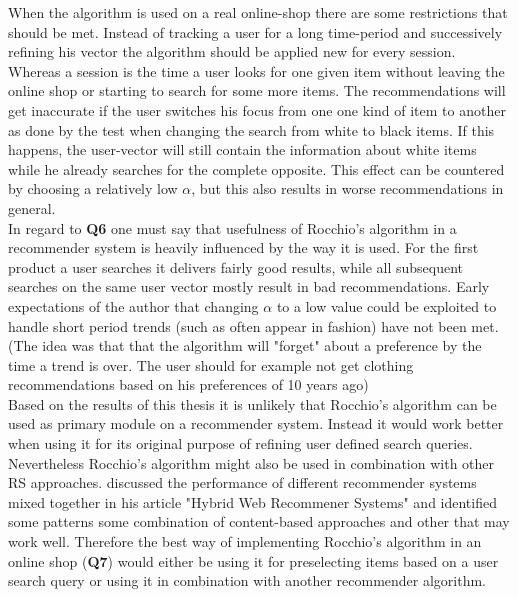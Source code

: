 \noindent
When the algorithm is used on a real online-shop there are some restrictions that should be met.
Instead of tracking a user for a long time-period and successively refining his vector the algorithm should be applied new for every session.
Whereas a session is the time a user looks for one given item without leaving the online shop or starting to search for some more items.
The recommendations will get inaccurate if the user switches his focus from one one kind of item to another as done by the test when changing the search from white to black items.
If this happens, the user-vector will still contain the information about white items while he already searches for the complete opposite.
This effect can be countered by choosing a relatively low $\alpha$, but this also results in worse recommendations in general.
\\
In regard to \textbf{Q6} one must say that usefulness of Rocchio's algorithm in a recommender system is heavily influenced by the way it is used.
For the first product a user searches it delivers fairly good results, while all subsequent searches on the same user vector mostly result in bad recommendations.
Early expectations of the author that changing $\alpha$ to a low value could be exploited to handle short period trends (such as often appear in fashion) have not been met.
(The idea was that that the algorithm will "forget" about a preference by the time a trend is over. The user should for example not get clothing recommendations based on his preferences of 10 years ago)
\\

\noindent
Based on the results of this thesis it is unlikely that Rocchio's algorithm can be used as primary module on a recommender system.
Instead it would work better when using it for its original purpose of refining user defined search queries.
Nevertheless Rocchio's algorithm might also be used in combination with other RS approaches.
\citeauthor{burke:2007} discussed the performance of different recommender systems mixed together in his article "Hybrid Web Recommener Systems" and identified some patterns some combination of content-based approaches and other that may work well.
Therefore the best way of implementing Rocchio's algorithm in an online shop (\textbf{Q7}) would either be using it for preselecting items based on a user search query or using it in combination with another recommender algorithm.

